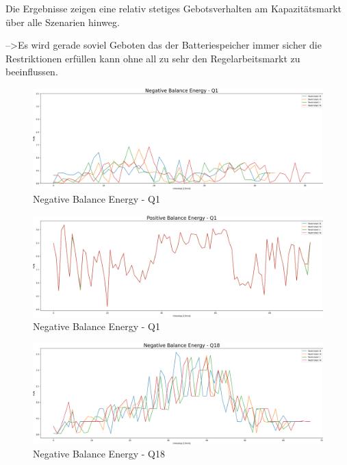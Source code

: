 Die Ergebnisse zeigen eine relativ stetiges Gebotsverhalten am Kapazitätsmarkt über alle Szenarien hinweg.

-->Es wird gerade soviel Geboten
das der Batteriespeicher immer sicher die Restriktionen erfüllen kann ohne all zu sehr den Regelarbeitsmarkt zu beeinflussen.

\begin{figure}[!h]
	\includegraphics[width=1\linewidth]{pictures/results/Negative Balance Energy - Q1.png}
	\caption{Negative Balance Energy - Q1}
	\label{fig:Negative Balance Energy - Q1}
\end{figure}

\begin{figure}[!h]
	\includegraphics[width=1\linewidth]{pictures/results/Positive Balance Energy - Q1.png}
	\caption{Negative Balance Energy - Q1}
	\label{fig:Negative Balance Energy - Q1}
\end{figure}



\begin{figure}[!h]
	\includegraphics[width=1\linewidth]{pictures/results/Negative Balance Energy - Q18.png}
	\caption{Negative Balance Energy - Q18}
	\label{fig:Negative Balance Energy - Q18}
\end{figure}

